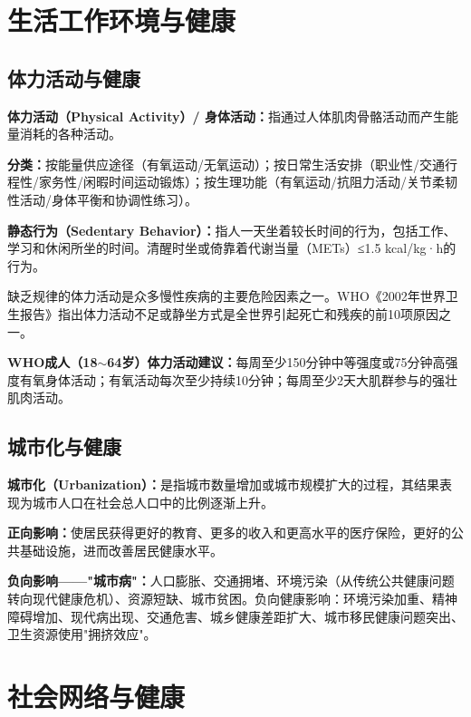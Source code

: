 \section{生活工作环境与健康}

\subsection{体力活动与健康}

\begin{defbox}
\textbf{体力活动（Physical Activity）/ 身体活动：}指通过人体肌肉骨骼活动而产生能量消耗的各种活动。

\textbf{分类：}按能量供应途径（有氧运动/无氧运动）；按日常生活安排（职业性/交通行程性/家务性/闲暇时间运动锻炼）；按生理功能（有氧运动/抗阻力活动/关节柔韧性活动/身体平衡和协调性练习）。

\textbf{静态行为（Sedentary Behavior）：}指人一天坐着较长时间的行为，包括工作、学习和休闲所坐的时间。清醒时坐或倚靠着代谢当量（METs）≤1.5 kcal/kg·h的行为。

缺乏规律的体力活动是众多慢性疾病的主要危险因素之一。WHO《2002年世界卫生报告》指出体力活动不足或静坐方式是全世界引起死亡和残疾的前10项原因之一。

\textbf{WHO成人（18$\sim$64岁）体力活动建议：}每周至少150分钟中等强度或75分钟高强度有氧身体活动；有氧活动每次至少持续10分钟；每周至少2天大肌群参与的强壮肌肉活动。
\end{defbox}

\subsection{城市化与健康}

\begin{defbox}
\textbf{城市化（Urbanization）：}是指城市数量增加或城市规模扩大的过程，其结果表现为城市人口在社会总人口中的比例逐渐上升。

\textbf{正向影响：}使居民获得更好的教育、更多的收入和更高水平的医疗保险，更好的公共基础设施，进而改善居民健康水平。

\textbf{负向影响——"城市病"：}人口膨胀、交通拥堵、环境污染（从传统公共健康问题转向现代健康危机）、资源短缺、城市贫困。负向健康影响：环境污染加重、精神障碍增加、现代病出现、交通危害、城乡健康差距扩大、城市移民健康问题突出、卫生资源使用"拥挤效应"。
\end{defbox}

\section{社会网络与健康}

